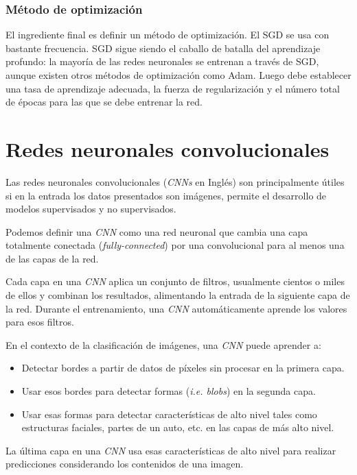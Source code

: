 \documentclass[a4paper,12pt]{article}
\begin{document}
\subsubsection{Método de optimización}
El ingrediente final es definir un método de optimización. El SGD se usa con bastante frecuencia.
SGD sigue siendo el caballo de batalla del aprendizaje profundo: la mayoría de las redes neuronales se entrenan a través de SGD, aunque existen otros métodos de optimización como Adam.
Luego debe establecer una tasa de aprendizaje adecuada, la fuerza de regularización y el número total de épocas para las que se debe entrenar la red.

\section{Redes neuronales convolucionales}
Las redes neuronales convolucionales \citep{rosebrock2017deep} (\textit{CNNs} en Inglés) son principalmente útiles si en la entrada los datos presentados son imágenes, permite el desarrollo de modelos supervisados y no supervisados.

Podemos definir una \textit{CNN} como una red neuronal que cambia una capa totalmente conectada (\textit{fully-connected}) por una convolucional para al menos una de las capas de la red.

Cada capa en una \textit{CNN} aplica un conjunto de filtros, usualmente cientos o miles de ellos y combinan los resultados, alimentando la entrada de la siguiente capa de la red. Durante el entrenamiento, una \textit{CNN} automáticamente aprende los valores para esos filtros.

En el contexto de la clasificación de imágenes, una \textit{CNN} puede aprender a:
\begin{itemize}
	\item Detectar bordes a partir de datos de píxeles sin procesar en la primera capa.
	\item Usar esos bordes para detectar formas (\textit{i.e. blobs}) en la segunda capa.
	\item Usar esas formas para detectar características de alto nivel tales como estructuras faciales, partes de un auto, etc. en las capas de más alto nivel.
\end{itemize}

La última capa en una \textit{CNN} usa esas características de alto nivel para realizar predicciones considerando los contenidos de una imagen.
\end{document}
